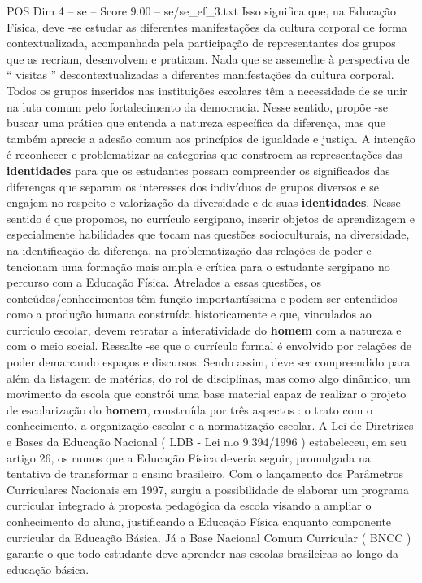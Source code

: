 \begin{textsample}{POS Dim 4 – se – Score 9.00 – se/se\_ef\_3.txt}
Isso significa que, na Educação Física, deve -se estudar as diferentes manifestações da cultura corporal de forma contextualizada, acompanhada pela participação de representantes dos grupos que as recriam, desenvolvem e praticam.
Nada que se assemelhe à perspectiva de “ visitas ” descontextualizadas a diferentes manifestações da cultura corporal.
Todos os grupos inseridos nas instituições escolares têm a necessidade de se unir na luta comum pelo fortalecimento da democracia.
Nesse sentido, propõe -se buscar uma prática que entenda a natureza específica da diferença, mas que também aprecie a adesão comum aos princípios de igualdade e justiça.
A intenção é reconhecer e problematizar as categorias que constroem as representações das \textbf{identidades} para que os estudantes possam compreender os significados das diferenças que separam os interesses dos indivíduos de grupos diversos e se engajem no respeito e valorização da diversidade e de suas \textbf{identidades}.
Nesse sentido é que propomos, no currículo sergipano, inserir objetos de aprendizagem e especialmente habilidades que tocam nas questões socioculturais, na diversidade, na identificação da diferença, na problematização das relações de poder e tencionam uma formação mais ampla e crítica para o estudante sergipano no percurso com a Educação Física.
Atrelados a essas questões, os conteúdos/conhecimentos têm função importantíssima e podem ser entendidos como a produção humana construída historicamente e que, vinculados ao currículo escolar, devem retratar a interatividade do \textbf{homem} com a natureza e com o meio social.
Ressalte -se que o currículo formal é envolvido por relações de poder demarcando espaços e discursos.
Sendo assim, deve ser compreendido para além da listagem de matérias, do rol de disciplinas, mas como algo dinâmico, um movimento da escola que constrói uma base material capaz de realizar o projeto de escolarização do \textbf{homem}, construída por três aspectos : o trato com o conhecimento, a organização escolar e a normatização escolar.
A Lei de Diretrizes e Bases da Educação Nacional ( LDB - Lei n.o 9.394/1996 ) estabeleceu, em seu artigo 26, os rumos que a Educação Física deveria seguir, promulgada na tentativa de transformar o ensino brasileiro.
Com o lançamento dos Parâmetros Curriculares Nacionais em 1997, surgiu a possibilidade de elaborar um programa curricular integrado à proposta pedagógica da escola visando a ampliar o conhecimento do aluno, justificando a Educação Física enquanto componente curricular da Educação Básica.
Já a Base Nacional Comum Curricular ( BNCC ) garante o que todo estudante deve aprender nas escolas brasileiras ao longo da educação básica.

\end{textsample}
